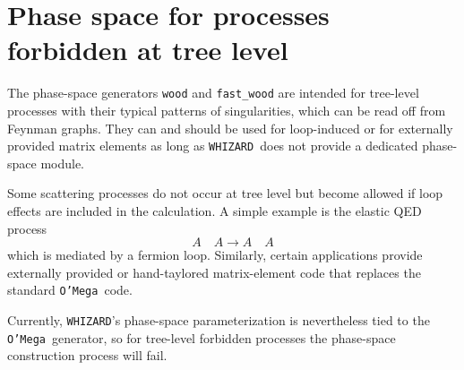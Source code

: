 \documentclass[12pt]{book}
\newcommand{\ttt}[1]{\texttt{#1}}
\newcommand{\whizard}{\ttt{WHIZARD}}
\newcommand{\oMega}{\ttt{O'Mega}}
\begin{document}

\section{Phase space for processes forbidden at tree level}
\label{sec:ps_anomalous}

The phase-space generators \ttt{wood} and \ttt{fast\_wood} are
intended for tree-level processes with their typical patterns of
singularities, which can be read off from Feynman graphs.  They can
and should be used for loop-induced or for externally provided matrix
elements as long as \whizard\ does not provide a dedicated phase-space
module.

Some scattering processes do not occur at tree level but become
allowed if loop effects are included in the calculation.  A simple
example is the elastic QED process
\begin{displaymath}
  A\quad A \longrightarrow A\quad A
\end{displaymath}
which is mediated by a fermion loop.  Similarly, certain applications
provide externally provided or hand-taylored matrix-element code that
replaces the standard \oMega\ code.

Currently, \whizard's phase-space parameterization is nevertheless
tied to the \oMega\ generator, so for tree-level forbidden processes
the phase-space construction process will fail.
\end{document}

